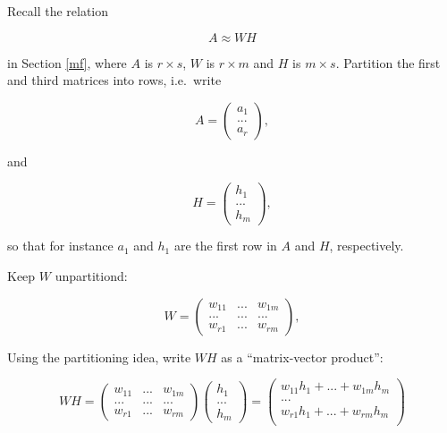 Recall the relation 

\begin{equation}
A \approx WH
\end{equation}

in Section \ref{mf}, where $A$ is $r \times s$, $W$ is $r \times m$ and
$H$ is $m \times s$.  Partition the first and third  matrices into rows, i.e.\
write


\begin{equation}
A =
\left (
\begin{array}{c}
a_1 \\
... \\
a_r 
\end{array}
\right ),
\end{equation}

and

\begin{equation}
H =
\left (
\begin{array}{c}
h_1 \\
... \\
h_m 
\end{array}
\right ),
\end{equation}

so that for instance $a_1$ and $h_1$ are the first row in $A$ and $H$,
respectively.

Keep $W$ unpartitiond:

\begin{equation}
W = 
\left (
\begin{array}{ccc}
w_{11} & ... & w_{1m}\\
... & ... & ... \\
w_{r1} & ... & w_{rm}
\end{array}
\right ),
\end{equation}

Using the partitioning idea, write $WH$ as a ``matrix-vector product'':

\begin{equation}
WH =
\left (
\begin{array}{ccc}
w_{11} & ... & w_{1m}\\
... & ... & ... \\
w_{r1} & ... & w_{rm}
\end{array}
\right )
\left (
\begin{array}{cc}
h_1 \\
... \\
h_m 
\end{array}
\right )
=
\left (
\begin{array}{cc}
w_{11}h_1 + ... + w_{1m} h_m \\
... \\
w_{r1}h_1 + ... + w_{rm} h_m \\
\end{array}
\right )
\end{equation}

